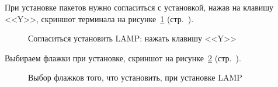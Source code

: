 При установке пакетов нужно согласиться с установкой, нажав на клавишу <<Y>>, скриншот терминала на рисунке~\ref{fig:sudo-apt-install-apache2-step-1} (стр.~\pageref{fig:sudo-apt-install-apache2-step-1}).

\begin{figure}[!htp]
    \caption{Согласиться установить LAMP: нажать клавишу <<Y>>}
    \label{fig:sudo-apt-install-apache2-step-1}
\end{figure}

Выбираем флажки при установке, скриншот на рисунке~\ref{fig:sudo-apt-install-apache2-step-2} (стр.~\pageref{fig:sudo-apt-install-apache2-step-2}).

\begin{figure}[!htp]
    \caption{Выбор флажков того, что установить, при установке LAMP}
    \label{fig:sudo-apt-install-apache2-step-2}
\end{figure}

